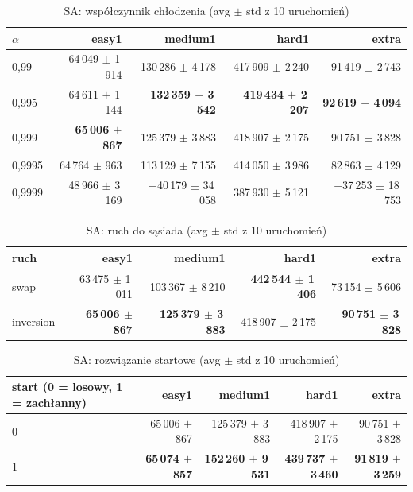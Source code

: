 \begin{table}[H]
  \centering
  \small
  \caption{SA: współczynnik chłodzenia (avg $\pm$ std z 10 uruchomień)}
  \label{tab:sa-cooling}
  \begin{tabular}{lrrrr}
    \toprule
    $\alpha$ & easy1 & medium1 & hard1 & extra \\
    \midrule
    0{,}99 & 64\,049 $\pm$ 1\,914 & 130\,286 $\pm$ 4\,178 & 417\,909 $\pm$ 2\,240 & 91\,419 $\pm$ 2\,743 \\
    0{,}995 & 64\,611 $\pm$ 1\,144 & \textbf{132\,359 $\pm$ 3\,542} & \textbf{419\,434 $\pm$ 2\,207} & \textbf{92\,619 $\pm$ 4\,094} \\
    0{,}999 & \textbf{65\,006 $\pm$ 867} & 125\,379 $\pm$ 3\,883 & 418\,907 $\pm$ 2\,175 & 90\,751 $\pm$ 3\,828 \\
    0{,}9995 & 64\,764 $\pm$ 963 & 113\,129 $\pm$ 7\,155 & 414\,050 $\pm$ 3\,986 & 82\,863 $\pm$ 4\,129 \\
    0{,}9999 & 48\,966 $\pm$ 3\,169 & $-$40\,179 $\pm$ 34\,058 & 387\,930 $\pm$ 5\,121 & $-$37\,253 $\pm$ 18\,753 \\
    \bottomrule
  \end{tabular}
\end{table}

\begin{table}[H]
  \centering
  \small
  \caption{SA: ruch do sąsiada (avg $\pm$ std z 10 uruchomień)}
  \label{tab:sa-move}
  \begin{tabular}{lrrrr}
    \toprule
    ruch & easy1 & medium1 & hard1 & extra \\
    \midrule
    swap & 63\,475 $\pm$ 1\,011 & 103\,367 $\pm$ 8\,210 & \textbf{442\,544 $\pm$ 1\,406} & 73\,154 $\pm$ 5\,606 \\
    inversion & \textbf{65\,006 $\pm$ 867} & \textbf{125\,379 $\pm$ 3\,883} & 418\,907 $\pm$ 2\,175 & \textbf{90\,751 $\pm$ 3\,828} \\
    \bottomrule
  \end{tabular}
\end{table}

\begin{table}[H]
  \centering
  \small
  \caption{SA: rozwiązanie startowe (avg $\pm$ std z 10 uruchomień)}
  \label{tab:sa-greedy-start}
  \begin{tabular}{lrrrr}
    \toprule
    start (0 = losowy, 1 = zachłanny) & easy1 & medium1 & hard1 & extra \\
    \midrule
    0 & 65\,006 $\pm$ 867 & 125\,379 $\pm$ 3\,883 & 418\,907 $\pm$ 2\,175 & 90\,751 $\pm$ 3\,828 \\
    1 & \textbf{65\,074 $\pm$ 857} & \textbf{152\,260 $\pm$ 9\,531} & \textbf{439\,737 $\pm$ 3\,460} & \textbf{91\,819 $\pm$ 3\,259} \\
    \bottomrule
  \end{tabular}
\end{table}


